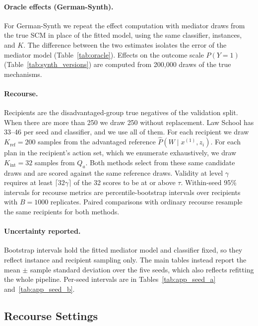 \paragraph{Oracle effects (German-Synth).}
For German-Synth we repeat the effect computation with mediator draws from the
true SCM in place of the fitted model, using the same classifier, instances,
and $K$. The difference between the two estimates isolates the error of the
mediator model (Table~\ref{tab:oracle}). Effects on the outcome scale
$P(Y=1)$ (Table~\ref{tab:synth_versions}) are computed from 200{,}000 draws of
the true mechanisms.

\paragraph{Recourse.}
Recipients are the disadvantaged-group true negatives of the validation
split. When there are more than 250 we draw 250 without replacement. Law
School has 33--46 per seed and classifier, and we use all of them. For each
recipient we draw $K_{\mathrm{ref}}=200$ samples from the advantaged reference
$\hat P(W\mid x^{(1)},z_i)$. For each plan in the recipient's action set,
which we enumerate exhaustively, we draw $K_{\mathrm{int}}=32$ samples from
$Q_a$. Both methods select from these same candidate draws and are scored
against the same reference draws. Validity at level $\gamma$ requires at least
$\lceil 32\gamma\rceil$ of the 32 scores to be at or above $\tau$. Within-seed
95\% intervals for recourse metrics are percentile-bootstrap intervals over
recipients with $B=1000$ replicates. Paired comparisons with ordinary recourse
resample the same recipients for both methods.

\paragraph{Uncertainty reported.}
Bootstrap intervals hold the fitted mediator model and classifier fixed, so
they reflect instance and recipient sampling only. The main tables instead
report the mean $\pm$ sample standard deviation over the five seeds, which
also reflects refitting the whole pipeline. Per-seed intervals are in
Tables~\ref{tab:app_seed_a} and~\ref{tab:app_seed_b}.

\subsection{Recourse Settings}
\label{app:exp_recourse}

